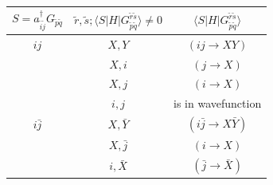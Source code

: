 \begin{table} 
	\begin{tabular}{ c|c|c }
		\hline \hline
		$S = a^\dagger_{\tilde i \tilde j} G_{\tilde p \tilde q} $                   & $\tilde r, \tilde s ; \langle S|H|G_{\tilde p \tilde q}^{\tilde r \tilde s} \rangle \neq 0$  & $\langle S|H|G_{\tilde p \tilde q}^{\tilde r \tilde s} \rangle$ \\
		\hline \hline
		\rule{0pt}{3ex}  $ij$                                                                                               & $X,Y$                                                                                        & $(ij \rightarrow XY)$                                           \\
		                                                                                                                                                                                                 & $X,i$                                                                                        & $(j \rightarrow X)$                                             \\
		                                                                                                   & $X,j$                                                                                        & $(i \rightarrow X)$                                             \\
		                                                                                                   & $i,j$                                                                                        & is in wavefunction                                              \\
		\hline
		\rule{0pt}{3ex} $i\bar{j}$                                                                                         & $X,\bar Y$                                                                                   & $(i \bar j\rightarrow X \bar Y)$                                \\ 
		                                                                                                   & $X,\bar j$                                                                                   & $(i\rightarrow X)$                                              \\ 
		                                                                                                   & $i,\bar X$                                                                                   & $(\bar j\rightarrow \bar X)$                                    \\ 

\end{tabular}
\end{table}
